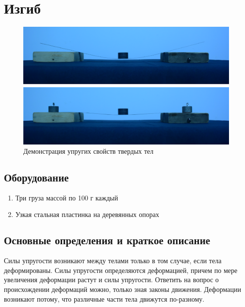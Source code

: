 \documentclass[All.tex]{subfiles}
\begin{document}

	\section{Изгиб}


\begin{figure}[H] 
	\centering 
	\includegraphics[width=0.9\linewidth]{bend-1.png}
	\caption{Демонстрация упругих свойств твердых тел}
	\label{bend-1}
\end{figure}

\subsection*{\textcolor{PineGreen}{Оборудование}}

\begin{enumerate}
	\item Три груза массой по 100 г каждый
	\item Узкая стальная пластинка на деревянных опорах
\end{enumerate}

\subsection*{\textcolor{PineGreen}{Основные определения и краткое описание}}

Силы упругости возникают между телами только в том случае, если тела деформированы.
Силы упругости определяются деформацией, причем по мере увеличения деформации растут и силы упругости.
Ответить на вопрос о происхождении деформаций можно, только зная законы движения.
Деформации возникают потому, что различные части тела движутся по-разному.
\end{document}
